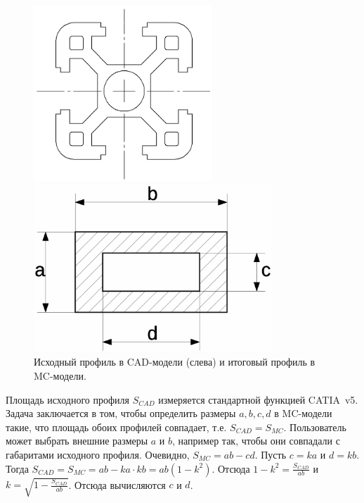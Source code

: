 \begin{figure}[H]
\begin{minipage}[b]{0.495\textwidth}
\centering
\includegraphics[width=0.6\textwidth]{pictures/Complex_profile.png}
\end{minipage}
\hspace{0.01\textwidth}
\begin{minipage}[b]{0.495\textwidth}
\centering
\includegraphics[width=0.8\textwidth]{pictures/Material_budget.eps}
\end{minipage}
\caption{Исходный профиль в CAD-модели (слева) и итоговый профиль в MC-модели.}
\label{fig:geoProfiles}
\end{figure}

Площадь исходного профиля $S_{CAD}$ измеряется стандартной функцией CATIA~v5. Задача заключается в том, чтобы определить размеры $a, b, c, d$ в MC-модели такие, что площадь обоих профилей совпадает, т.е. $S_{CAD} = S_{MC}$. Пользователь может выбрать внешние размеры $a$ и $b$, например так, чтобы они совпадали с габаритами исходного профиля. Очевидно, $S_{MC} = ab - cd$. Пусть $c = ka$ и $d = kb$. Тогда $S_{CAD} = S_{MC} = ab - ka \cdot kb = ab(1 - k^2)$. Отсюда $1 - k^2 = \frac{S_{CAD}}{ab}$ и $k = \sqrt{1 - \frac{S_{CAD}}{ab}}$. Отсюда вычисляются $c$ и $d$.

